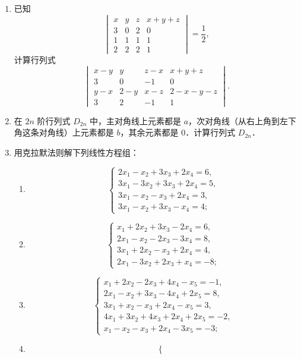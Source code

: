 \begin{enumerate}
\begin{enumerate}
\[    \]
  \anssub
  \end{enumerate}
  \item 已知
  \[
    \begin{vmatrix}
      x&y&z&x+y+z\\
      3&0&2&0\\
      1&1&1&1\\
      2&2&2&1
    \end{vmatrix}=\frac12,
  \]
  计算行列式
  \[
    \begin{vmatrix}
      x-y&y&z-x&x+y+z\\
      3&0&-1&0\\
      y-x&2-y&x-z&2-x-y-z\\
      3&2&-1&1
    \end{vmatrix}.
  \]
  \anscompute
  \item 在 $2n$ 阶行列式 $D_{2n}$ 中，主对角线上元素都是 $a$，次对角线（从右上角到左下角这条对角线）上元素都是 $b$，其余元素都是 $0$．计算行列式 $D_{2n}$．
  \anscompute
  \item 用克拉默法则解下列线性方程组：
  \begin{enumerate}
    \item \[
    \begin{cases}
      2x_1-x_2+3x_3+2x_4=6,\\
      3x_1-3x_2+3x_3+2x_4=5,\\
      3x_1-x_2-x_3+2x_4=3,\\
      3x_1-x_2+3x_3-x_4=4;
    \end{cases}
    \]
  \anssub
    \item \[
    \begin{cases}
      x_1+2x_2+3x_3-2x_4=6,\\
      2x_1-x_2-2x_3-3x_4=8,\\
      3x_1+2x_2-x_3+2x_4=4,\\
      2x_1-3x_2+2x_3+x_4=-8;
    \end{cases}
    \]
  \anssub
    \item \[
    \begin{cases}
      x_1+2x_2-2x_3+4x_4-x_5=-1,\\
      2x_1-x_2+3x_3-4x_4+2x_5=8,\\
      3x_1+x_2-x_3+2x_4-x_5=3,\\
      4x_1+3x_2+4x_3+2x_4+2x_5=-2,\\
      x_1-x_2-x_3+2x_4-3x_5=-3;
    \end{cases}
    \]
  \anssub
    \item \[
    \begin{cases}

\end{cases}\]
\end{enumerate}
\end{enumerate}
